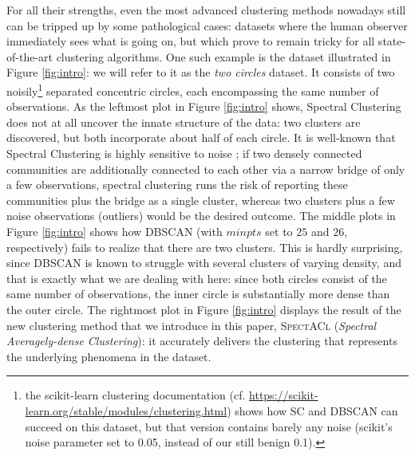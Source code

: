 For all their strengths, even the most advanced clustering methods nowadays still can be tripped up by some pathological cases: datasets where the human observer immediately sees what is going on, but which prove to remain tricky for all state-of-the-art clustering algorithms.  One such example is the dataset illustrated in Figure \ref{fig:intro}: we will refer to it as the \emph{two circles} dataset.  It consists of two noisily\footnote{the scikit-learn clustering documentation (cf. \url{https://scikit-learn.org/stable/modules/clustering.html}) shows how \textsc{SC} and DBSCAN can succeed on this dataset, but that version contains barely any noise (scikit's noise parameter set to 0.05, instead of our still benign 0.1).} separated concentric circles, each encompassing the same number of observations.  As the leftmost plot in Figure \ref{fig:intro} shows, Spectral Clustering does not at all uncover the innate structure of the data: two clusters are discovered, but both incorporate about half of each circle.  It is well-known that Spectral Clustering is highly sensitive to noise \cite[Figure 1]{bojchevski2017robust}; if
two densely connected communities are additionally connected to each other via a narrow bridge of only
a few observations, spectral clustering runs the risk of reporting these communities plus the bridge as
a single cluster, whereas two clusters plus a few noise observations (outliers) would be the desired 
outcome.
The middle plots in Figure \ref{fig:intro} shows how DBSCAN (with $minpts$ set to $25$ and $26$, respectively) fails to realize that there are two clusters. This is hardly surprising, since DBSCAN is known to struggle with several clusters of varying density, and that is exactly what we are dealing with here: since both circles consist of the same number of observations, the inner circle is substantially more dense than the outer circle.  The rightmost plot in Figure \ref{fig:intro} displays the result of the new clustering method that we introduce in this paper, \textsc{SpectACl} (\emph{Spectral Averagely-dense Clustering}): it accurately delivers the clustering that represents the underlying phenomena in the dataset.

